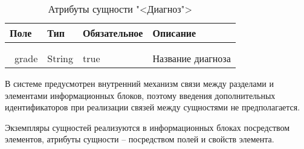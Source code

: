 \begin{xltabular}{\textwidth}{|l|l|p{1.7cm}|X|}
	\caption{Атрибуты сущности "<Диагноз">\label{diagnosis:table}}\\ \hline
	\centrow Поле & \centrow Тип & \centrow Обяза\-тельное & \centrow Описание \\ \hline
	 &  &  &  \\ \hline
	\endfirsthead
	 &  &  &  \\ \hline
	\finishhead
	\ grade & String & true & Название диагноза
\end{xltabular}

В системе предусмотрен внутренний механизм связи между разделами и элементами информационных блоков, поэтому введения дополнительных идентификаторов при реализации связей между сущностями не предполагается.

Экземпляры сущностей реализуются в информационных блоках посредством элементов, атрибуты сущности – посредством полей и свойств элемента. 
